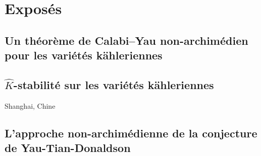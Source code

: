 \documentclass[11pt,a4paper,sans]{moderncv}
\begin{document}

\section{\enspace Exposés}
\subsection{Un théorème de Calabi--Yau non-archimédien pour les variétés kähleriennes}

\subsection{$\widehat K$-stabilité sur les variétés kähleriennes}
 {Shanghai, Chine}{}{}
\subsection{L'approche non-archimédienne de la conjecture de Yau-Tian-Donaldson}
\end{document}
